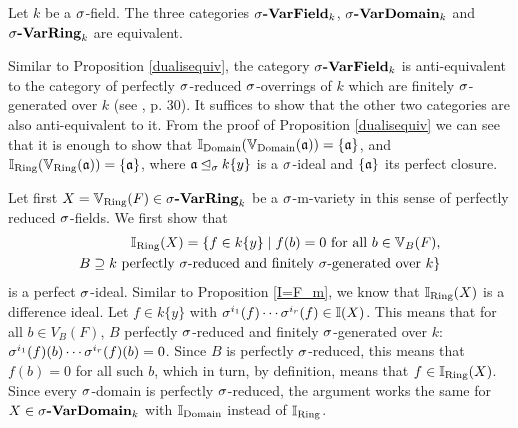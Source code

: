 \begin{prop}
Let $k$ be a $\sigma$-field. The three categories $\sigma\text{{\normalfont\textbf{-VarField}}}_k$, $\sigma\text{{\normalfont\textbf{-VarDomain}}}_k$ and $\sigma\text{{\normalfont\textbf{-VarRing}}}_k$ are equivalent.

\begin{bew}
Similar to Proposition \ref{dualisequiv}, the category $\sigma\text{{\normalfont\textbf{-VarField}}}_k$ is anti-equivalent to the category of perfectly $\sigma$-reduced $\sigma$-overrings of $k$ which are finitely $\sigma$-generated over $k$ (see \cite{wibmer}, p. 30).
It suffices to show that the other two categories are also anti-equivalent to it. From the proof of Proposition \ref{dualisequiv} we can see that it is enough to show that $\mathbb{I}_{\operatorname{Domain}}(\mathbb{V}_{\operatorname{Domain}}(\mathfrak{a})) = \{\mathfrak{a}\}$, and $\mathbb{I}_{\operatorname{Ring}}(\mathbb{V}_{\operatorname{Ring}}(\mathfrak{a})) = \{\mathfrak{a}\}$,
 where $\mathfrak{a} \unlhd_{\sigma} k\{y\}$ is a $\sigma$-ideal and $\{ \mathfrak{a} \}$ its perfect closure. 

Let first $X  = \mathbb{V}_{\operatorname{Ring}}(F) \in \sigma\text{{\normalfont\textbf{-VarRing}}}_k$ be a $\sigma$-m-variety in this sense of perfectly reduced $\sigma$-fields. 
We first show that \begin{align*} \mathbb{I}_{\operatorname{Ring}}(X) =  \{ f \in k\{y\} \mid f(b) = 0 \text{ for all } b \in \mathbb{V}_B(F), \\ B \supseteq k\text{ perfectly }\sigma\text{-reduced and finitely }\sigma\text{-generated over }k \} \end{align*}
 is a perfect $\sigma$-ideal. Similar to Proposition \ref{I=F_m}, we know that $\mathbb{I}_{\operatorname{Ring}}(X)$ is a difference ideal. Let $f \in k\{y\}$ with $\sigma^{i_1}(f) \cdots \sigma^{i_r}(f) \in \mathbb{I}(X)$. This means that for all $b \in V_B(F)$,
 $B$ perfectly $\sigma$-reduced and finitely $\sigma$-generated over $k$: $\sigma^{i_1}(f)(b) \cdots \sigma^{i_r}(f)(b) = 0$. Since $B$ is perfectly $\sigma$-reduced, this means that $f(b) = 0$ for all such $b$,
 which in turn, by definition, means that $f \in \mathbb{I}_{\operatorname{Ring}}(X)$. Since every $\sigma$-domain is perfectly $\sigma$-reduced, the argument works the same for $X \in \sigma\text{{\normalfont\textbf{-VarDomain}}}_k$ with $\mathbb{I}_{\operatorname{Domain}}$ instead of $\mathbb{I}_{\operatorname{Ring}}$.


\end{bew}
\end{prop}
